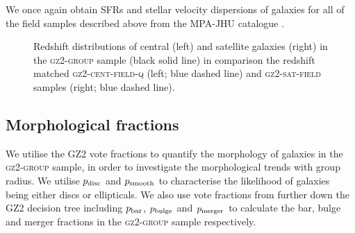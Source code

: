 \documentclass[useAMS,usenatbib]{mn2e}
\begin{document}
We once again obtain SFRs and stellar velocity dispersions of galaxies for all of the field samples described above from the MPA-JHU catalogue \citep{kauffmann03, brinchmann04}.

\begin{figure}
\caption[Redshift distribution of galaxies in the \textsc{gz2-group} sample]{Redshift distributions of central (left) and satellite galaxies (right) in the \textsc{gz2-group} sample (black solid line) in comparison the redshift matched \textsc{gz2-cent-field-q} (left; blue dashed line) and \textsc{gz2-sat-field} samples (right; blue dashed line).}
\label{fig:zcompare}
\end{figure}

\subsection{Morphological fractions}\label{sec:morphfrac}

We utilise the GZ2 vote fractions to quantify the morphology of galaxies in the \textsc{gz2-group} sample, in order to investigate the morphological trends with group radius. We utilise $p_{\rm{disc}}$ and $p_{\rm{smooth}}$ to characterise the likelihood of galaxies being either discs or ellipticals. We also use vote fractions from further down the GZ2 decision tree including $p_{\rm{bar}}$, $p_{\rm{bulge}}$ and $p_{\rm{merger}}$ to calculate the bar, bulge and merger fractions in the \textsc{gz2-group} sample respectively. 
\end{document}
